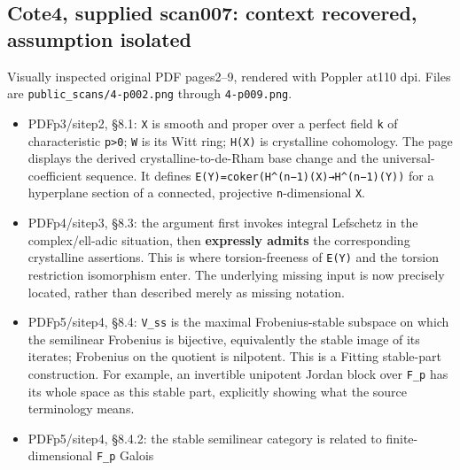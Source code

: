 \documentclass[
  10pt,
]{article}
\providecommand{\tightlist}{%
  \setlength{\itemsep}{0pt}\setlength{\parskip}{0pt}}
\providecommand{\tightlist}{\setlength{\itemsep}{0pt}\setlength{\parskip}{0pt}}
\begin{document}
\subsection{Cote4, supplied scan007: context recovered, assumption
isolated}\label{cote4-supplied-scan007-context-recovered-assumption-isolated}

Visually inspected original PDF pages2--9, rendered with Poppler at110
dpi. Files are
\texttt{\small public\_\allowbreak{}scans/\allowbreak{}4-\allowbreak{}p002.png}
through \texttt{\small 4-\allowbreak{}p009.png}.

\begin{itemize}
\tightlist
\item
  PDFp3/sitep2, §8.1: \texttt{\small X} is smooth and proper over a
  perfect field \texttt{\small k} of characteristic \texttt{\small p>0};
  \texttt{\small W} is its Witt ring;
  \texttt{\small H(\allowbreak{}X)\allowbreak{}} is crystalline
  cohomology. The page displays the derived crystalline-to-de-Rham base
  change and the universal-coefficient sequence. It defines
  \texttt{\small E(\allowbreak{}Y)\allowbreak{}=\allowbreak{}coker(\allowbreak{}H\textasciicircum{}(\allowbreak{}n−1)\allowbreak{}(\allowbreak{}X)\allowbreak{}→\allowbreak{}H\textasciicircum{}(\allowbreak{}n−1)\allowbreak{}(\allowbreak{}Y)\allowbreak{})\allowbreak{}}
  for a hyperplane section of a connected, projective
  \texttt{\small n}-dimensional \texttt{\small X}.
\item
  PDFp4/sitep3, §8.3: the argument first invokes integral Lefschetz in
  the complex/ell-adic situation, then \textbf{expressly admits} the
  corresponding crystalline assertions. This is where torsion-freeness
  of \texttt{\small E(\allowbreak{}Y)\allowbreak{}} and the torsion
  restriction isomorphism enter. The underlying missing input is now
  precisely located, rather than described merely as missing notation.
\item
  PDFp5/sitep4, §8.4: \texttt{\small V\_\allowbreak{}ss} is the maximal
  Frobenius-stable subspace on which the semilinear Frobenius is
  bijective, equivalently the stable image of its iterates; Frobenius on
  the quotient is nilpotent. This is a Fitting stable-part construction.
  For example, an invertible unipotent Jordan block over
  \texttt{\small F\_\allowbreak{}p} has its whole space as this stable
  part, explicitly showing what the source terminology means.
\item
  PDFp5/sitep4, §8.4.2: the stable semilinear category is related to
  finite-dimensional \texttt{\small F\_\allowbreak{}p} Galois

\end{itemize}
\end{document}
